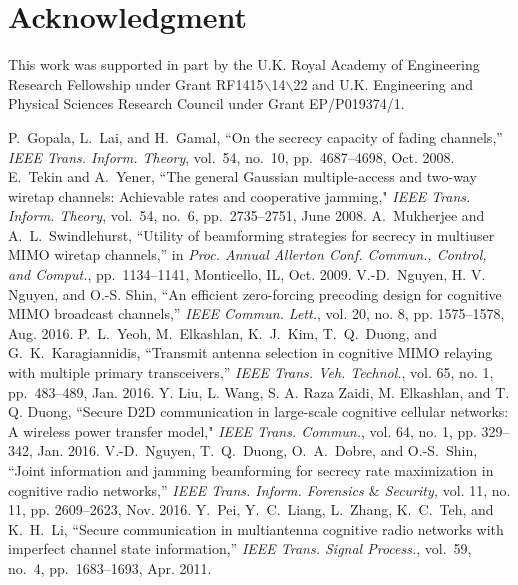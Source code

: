 \documentclass[journal,twoside]{IEEEtran}
\begin{document}
\vspace{-0.15cm}
\section*{Acknowledgment}
This work was supported in part by the U.K. Royal Academy of Engineering Research Fellowship under Grant RF1415$\backslash$14$\backslash$22 and U.K. Engineering and Physical Sciences Research Council under Grant EP/P019374/1.






\begin{thebibliography}{999}
P.~Gopala, L.~Lai, and H.~Gamal, ``On the secrecy capacity of fading channels,'' {\em IEEE Trans. Inform. Theory}, vol.~54, no.~10, pp.~4687--4698, Oct. 2008.
E.~Tekin and A.~Yener, ``The general Gaussian multiple-access and two-way wiretap channels: Achievable rates and cooperative jamming," {\em IEEE Trans. Inform. Theory}, vol.~54, no.~6, pp.~2735--2751, June 2008. 
A.~Mukherjee and A.~L.~Swindlehurst, ``Utility of beamforming strategies for secrecy in multiuser MIMO wiretap channels,'' in {\em Proc. Annual Allerton Conf.  Commun., Control, and Comput.}, pp.~1134--1141, Monticello, IL, Oct. 2009.
V.-D.~Nguyen, H. V. Nguyen, and O.-S. Shin, ``An efficient zero-forcing precoding design for cognitive MIMO broadcast channels,'' {\em IEEE Commun. Lett.}, vol. 20, no. 8, pp. 1575--1578, Aug. 2016.
P.~L.~Yeoh, M.~Elkashlan, K.~J.~Kim, T.~Q.~Duong, and G.~K.~Karagiannidis, ``Transmit antenna selection in cognitive MIMO relaying with multiple primary transceivers,'' {\em IEEE Trans. Veh. Technol.}, vol. 65, no. 1, pp.~483--489, Jan. 2016.
Y. Liu, L. Wang, S. A. Raza Zaidi, M. Elkashlan, and T. Q. Duong, ``Secure D2D communication in large-scale cognitive cellular networks: A wireless power transfer model," {\em IEEE Trans. Commun.}, vol. 64, no. 1, pp. 329--342, Jan. 2016.
V.-D.~Nguyen, T.~Q.~Duong, O.~A.~Dobre, and O.-S.~Shin, ``Joint information and jamming beamforming for secrecy rate maximization in cognitive radio networks,''  {\em IEEE Trans.  Inform. Forensics $\&$ Security,}  vol. 11, no. 11, pp. 2609--2623, Nov. 2016.
Y.~Pei, Y.~C.~Liang, L.~Zhang, K.~C.~Teh, and K.~H.~Li, ``Secure communication in multiantenna cognitive radio networks with imperfect channel state information,'' {\em IEEE Trans. Signal Process.}, vol.~59, no.~4, pp.~1683--1693, Apr. 2011.

\end{thebibliography}
\end{document}
